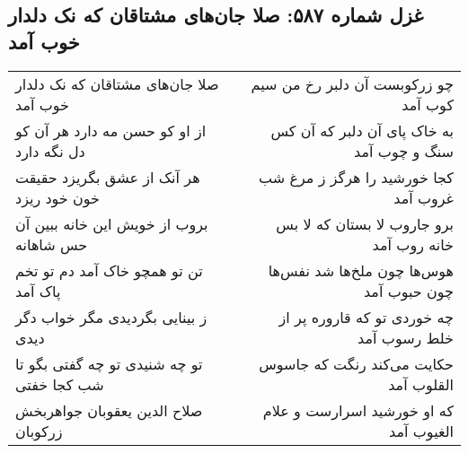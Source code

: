 \begin{center}
\section*{غزل شماره ۵۸۷: صلا جان‌های مشتاقان که نک دلدار خوب آمد}
\label{sec:0587}
\begin{longtable}{l p{0.5cm} r}
صلا جان‌های مشتاقان که نک دلدار خوب آمد
&&
چو زرکوبست آن دلبر رخ من سیم کوب آمد
\\
از او کو حسن مه دارد هر آن کو دل نگه دارد
&&
به خاک پای آن دلبر که آن کس سنگ و چوب آمد
\\
هر آنک از عشق بگریزد حقیقت خون خود ریزد
&&
کجا خورشید را هرگز ز مرغ شب غروب آمد
\\
بروب از خویش این خانه ببین آن حس شاهانه
&&
برو جاروب لا بستان که لا بس خانه روب آمد
\\
تن تو همچو خاک آمد دم تو تخم پاک آمد
&&
هوس‌ها چون ملخ‌ها شد نفس‌ها چون حبوب آمد
\\
ز بینایی بگردیدی مگر خواب دگر دیدی
&&
چه خوردی تو که قاروره پر از خلط رسوب آمد
\\
تو چه شنیدی تو چه گفتی بگو تا شب کجا خفتی
&&
حکایت می‌کند رنگت که جاسوس القلوب آمد
\\
صلاح الدین یعقوبان جواهربخش زرکوبان
&&
که او خورشید اسرارست و علام الغیوب آمد
\\
\end{longtable}
\end{center}
